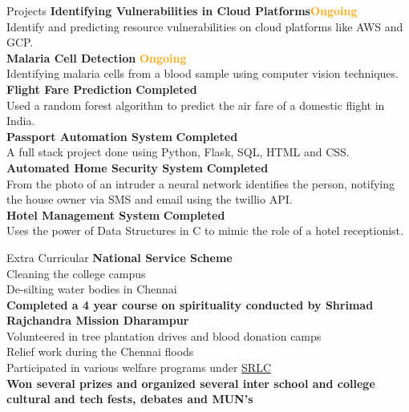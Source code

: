 \documentclass{resume}
\begin{document}
\begin{rSection}{Projects}
{\bf Identifying Vulnerabilities in Cloud  Platforms}\hfill{\textbf{\textcolor{Orange}{Ongoing}}}\\
Identify and predicting resource vulnerabilities on cloud platforms like AWS and GCP.\\
{\bf Malaria Cell Detection} \hfill{\textbf{\textcolor{Orange}{Ongoing}}}\\
Identifying malaria cells from a blood sample using computer vision techniques.\\
{\bf Flight Fare Prediction} \hfill{\textbf{\textcolor{OliveGreen}{Completed}}}\\
Used a random forest algorithm to predict the air fare of a domestic flight in India.\\
{\bf Passport Automation System} \hfill{\textbf{\textcolor{OliveGreen}{Completed}}}\\
A full stack project done using Python, Flask, SQL, HTML and CSS.\\
{\bf Automated Home Security System} \hfill{\textbf{\textcolor{OliveGreen}{Completed}}}\\
From the photo of an intruder a neural network identifies the person, notifying the house owner via SMS and email using the twillio API.\\
{\bf Hotel Management System} \hfill{\textbf{\textcolor{OliveGreen}{Completed}}}\\ 
Uses the power of Data Structures in C to mimic the role of a hotel receptionist.
\end{rSection}
\begin{rSection}{Extra Curricular} 
{\bf National Service Scheme}\\
Cleaning the college campus\\
De-silting water bodies in Chennai\\
{\bf Completed a 4 year course on spirituality conducted by Shrimad Rajchandra Mission Dharampur}\\
{Volunteered in tree plantation drives and blood donation camps}\\
{Relief work during the Chennai floods}\\
{Participated in various welfare programs under \href{https://www.srloveandcare.org/}{SRLC}}\\
{\bf Won several prizes and organized several inter school and college cultural and tech fests, debates and MUN's}
\end{rSection}
\end{document}
